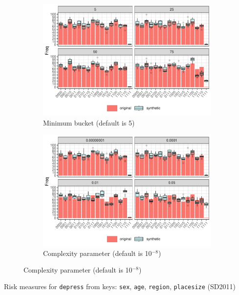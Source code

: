 \documentclass[a4paper,11pt]{style/uneceart}
\begin{document}
\begin{figure}[!h]
    \centering
    \caption{Compare original and synthetic data with different hyperparameters}
    \begin{subfigure}{0.9\textwidth}
        \includegraphics[width=\textwidth]{../../graphs/graph_cart_modified_mb_histogram_compare_10_v2.pdf}
        \caption{Minimum bucket (default is 5)}
        \label{fig:attacker_modified_mb_sensitivity}
    \end{subfigure}
    \hfill
    \begin{subfigure}{0.9\textwidth}
        \includegraphics[width=\textwidth]{../../graphs/graph_cart_modified_cp_histogram_compare_10_v2.pdf}
        \caption{Complexity parameter (default is 10$^{-8}$)}
        \label{fig:attacker_modified_cp_sensitivity}
    \end{subfigure}
    \label{fig:compare_modified_sensitivity}
\end{figure}


\begin{table}[!h]
    \centering
    \caption{Risk measures for \texttt{depress} from keys: \texttt{sex}, \texttt{age}, \texttt{region}, \texttt{placesize} (SD2011)}
    
    \label{tab:attribute_risk_sd2011}
\end{table}
\end{document}

